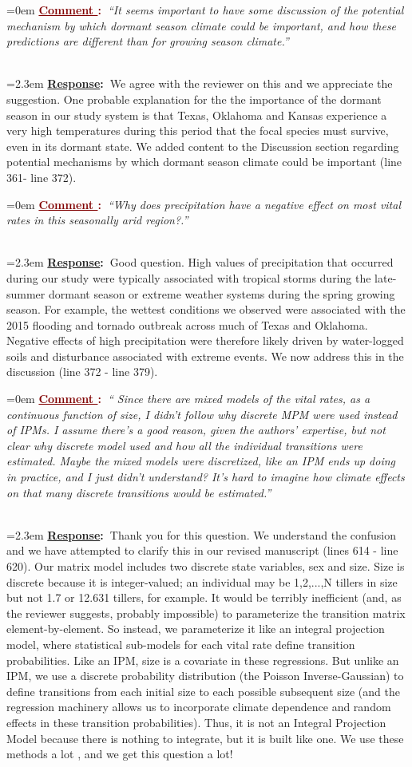 \documentclass[12pt]{article}
\newcounter{cN}
\newcommand{\comment}[1]{
	\vspace{2em}
	\refstepcounter{cN} %
	\noindent \hangindent=0em \textbf{\textcolor{Maroon}{\uline{Comment \thecN}:~}}\emph{``#1''}
	}
\newcommand{\response}[1]{
	\\[0.25em]
	\hangindent=2.3em \textbf{\textcolor{NavyBlue}{\uline{Response}:~}}#1
	}
\begin{document}
\comment{It seems important to have some discussion of the potential mechanism by which dormant season climate could be important, and how these predictions are different than for growing season climate.}
\response{We agree with the reviewer on this and we appreciate the suggestion.  
One probable explanation for the the importance of the dormant season in our study system is that Texas, Oklahoma and Kansas experience a very high temperatures during this period that the focal species must survive, even in its dormant state.
We added content to the Discussion section regarding potential mechanisms by which dormant season climate could be important (line  361- line 372).}

\comment{Why does precipitation have a negative effect on most vital rates in this seasonally arid region?.}
\response{Good question. High values of precipitation that occurred during our study were typically associated with tropical storms during the late-summer dormant season or extreme weather systems during the spring growing season. 
For example, the wettest conditions we observed were associated with the 2015 flooding and tornado outbreak across much of Texas and Oklahoma. 
Negative effects of high precipitation were therefore likely driven by water-logged soils and disturbance associated with extreme events. 
We now address this in the discussion (line 372 - line 379).
}

\comment{ Since there are mixed models of the vital rates, as a continuous function of size, I didn’t follow why discrete MPM were used instead of IPMs. I assume there’s a good reason, given the authors’ expertise, but not clear why discrete model used and how all the individual transitions were estimated. Maybe the mixed models were discretized, like an IPM ends up doing in practice, and I just didn’t understand? It’s hard to imagine how climate effects on that many discrete transitions would be estimated.}
\response{Thank you for this question. We understand the confusion and we have attempted to clarify this in our revised manuscript (lines 614 - line 620).
Our matrix model includes two discrete state variables, sex and size. 
Size is discrete because it is integer-valued; an individual may be 1,2,...,N tillers in size but not 1.7 or 12.631 tillers, for example. 
It would be terribly inefficient (and, as the reviewer suggests, probably impossible) to parameterize the transition matrix element-by-element. 
So instead, we parameterize it like an integral projection model, where statistical sub-models for each vital rate define transition probabilities. 
Like an IPM, size is a covariate in these regressions. 
But unlike an IPM, we use a discrete probability distribution (the Poisson Inverse-Gaussian) to define transitions from each initial size to each possible subsequent size (and the regression machinery allows us to incorporate climate dependence and random effects in these transition probabilities). 
Thus, it is not an Integral Projection Model because there is nothing to integrate, but it is built like one. 
We use these methods a lot \citep{compagnoni2017can,lynn2021mammalian,fowler2024microbial}, and we get this question a lot!
}
\end{document}

